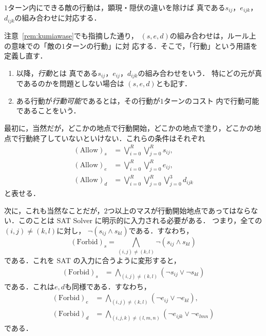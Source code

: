 \begin{rem} \label{rem:kumiawase}
 $1$ターン内にできる敵の行動は，顕現・隠伏の違いを除けば
 真である$s_{ij}$，$e_{ijk}$，$d_{ijk}$の組み合わせに対応する．
\end{rem}

注意~\ref{rem:kumiawase}でも指摘した通り，
$(s, e, d)$の組み合わせは，ルール上の意味での「敵の$1$ターンの行動」に対
応する．そこで，「行動」という用語を定義し直す．

\begin{defn} \label{defn:koudou-sed}
 \begin{enumerate}[1.]
  \item 以降，\emph{行動}とは
        真である$s_{ij}$，$e_{ij}$，$d_{ijk}$の組み合わせをいう．
        特にどの元が真であるのかを問題としない場合は
        $(s, e, d)$とも記す．
  \item ある行動が\emph{行動可能}であるとは，その行動が$1$ターンのコスト
        内で行動可能であることをいう．
 \end{enumerate}
\end{defn}

最初に，当然だが，どこかの地点で行動開始，どこかの地点で塗り，どこかの地
点で行動終了していないといけない．これらの条件はそれぞれ
\begin{align*}
 (\text{Allow})_s &= \bigvee_{i = 0}^R \bigvee_{j = 0}^R s_{ij}, \\
 (\text{Allow})_e &= \bigvee_{i = 0}^R \bigvee_{j = 0}^R e_{ij}, \\
 (\text{Allow})_d &=
 \bigvee_{i = 0}^R \bigvee_{j = 0}^R \bigvee_{j = 0}^3 d_{ijk}
\end{align*}
と表せる．

次に，これも当然なことだが，$2$つ以上のマスが行動開始地点であってはならな
い．このことは SAT Solver に明示的に入力される必要がある．
つまり，全ての$(i, j) \neq (k, l)$に対し，
$\lnot (s_{ij} \land s_{kl})$である．すなわち，
\[
 (\text{Forbid})_s = 
 \bigwedge_{(i, j) \neq (k, l)} \lnot
 (s_{ij} \land s_{kl})
\]
である．これを SAT の入力に合うように変形すると，
\begin{align*}
 (\text{Forbid})_s &= \bigwedge_{(i, j) \neq (k, l)} (\lnot
 s_{ij} \lor \lnot s_{kl}) 
\end{align*}
である．これは$e, d$も同様である．すなわち，
\begin{align*}
 (\text{Forbid})_e &= \bigwedge_{(i, j) \neq (k, l)} (\lnot
 e_{ij} \lor \lnot e_{kl}), \\
 (\text{Forbid})_d &= \bigwedge_{(i, j, k) \neq (l, m, n)} (\lnot
 e_{ijk} \lor \lnot e_{lmn})
\end{align*}
である．

